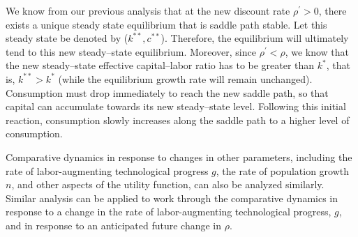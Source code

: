 \documentclass[\topdir/lecture\_notes.tex]{subfiles}
\begin{document}
We know from our previous analysis that at the new discount rate \(\rho^{\prime}>0\), there exists a unique steady state equilibrium that is saddle path stable. Let this steady state be denoted by (\(k^{* *}, c^{* *}\)). Therefore, the equilibrium will ultimately tend to this new steady--state equilibrium. Moreover, since \(\rho^{\prime}<\rho\), we know that the new steady--state effective capital--labor ratio has to be greater than \(k^{*}\), that is, \(k^{* *}>k^{*}\) (while the equilibrium growth rate will remain unchanged). Consumption must drop immediately to reach the new saddle path, so that capital can accumulate towards its new steady--state level. Following this initial reaction, consumption slowly increases along the saddle path to a higher level of consumption.


Comparative dynamics in response to changes in other parameters, including the rate of labor-augmenting technological progress \(g\), the rate of population growth \(n\), and other aspects of the utility function, can also be analyzed similarly. Similar analysis can be applied to work through the comparative dynamics in response to a change in the rate of labor-augmenting technological progress, \(g\), and in response to an anticipated future change in \(\rho\).
\end{document}
